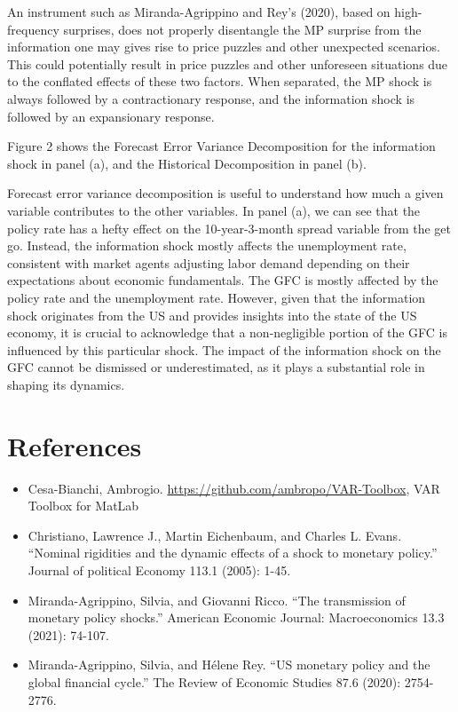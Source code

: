 \documentclass[11pt,a4paper]{article}
\begin{document}
An instrument such as Miranda-Agrippino and Rey's (2020), based on high-frequency surprises, does not properly disentangle the MP surprise from the information one may gives rise to price puzzles and other unexpected scenarios. This could potentially result in price puzzles and other unforeseen situations due to the conflated effects of these two factors. When separated, the MP shock is always followed by a contractionary response, and the information shock is followed by an expansionary response.
    

Figure 2 shows the Forecast Error Variance Decomposition for the information shock in panel (a), and the Historical Decomposition in panel (b).

Forecast error variance decomposition is useful to understand how much a given variable contributes to the other variables. In panel (a), we can see that the policy rate has a hefty effect on the 10-year-3-month spread variable from the get go. Instead, the information shock mostly affects the unemployment rate, consistent with market agents adjusting labor demand depending on their expectations about economic fundamentals.
The GFC is mostly affected by the policy rate and the unemployment rate. %
However, given that the information shock originates from the US and provides insights into the state of the US economy, it is crucial to acknowledge that a non-negligible portion of the GFC is influenced by this particular shock. The impact of the information shock on the GFC cannot be dismissed or underestimated, as it plays a substantial role in shaping its dynamics.






\newpage
\section*{References}
\begin{itemize}
    \item Cesa-Bianchi, Ambrogio. \url{https://github.com/ambropo/VAR-Toolbox}, VAR Toolbox for MatLab
    \item Christiano, Lawrence J., Martin Eichenbaum, and Charles L. Evans. \enquote{Nominal rigidities and the dynamic effects of a shock to monetary policy.} Journal of political Economy 113.1 (2005): 1-45.
    \item Miranda-Agrippino, Silvia, and Giovanni Ricco. \enquote{The transmission of monetary policy shocks.} American Economic Journal: Macroeconomics 13.3 (2021): 74-107.
    \item Miranda-Agrippino, Silvia, and Hélene Rey. \enquote{US monetary policy and the global financial cycle.} The Review of Economic Studies 87.6 (2020): 2754-2776.
    
\end{itemize}
\end{document}
